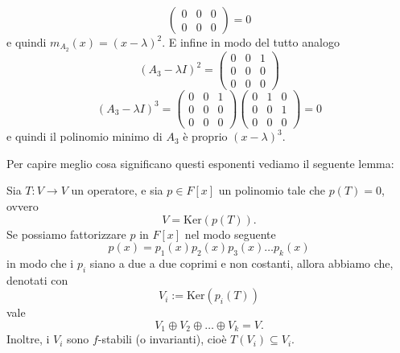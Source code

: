\documentclass[11pt]{scrartcl}
\renewcommand{\ker}[1]{\text{Ker}\left(#1\right)}
\begin{document}
\begin{example}
$$\begin{pmatrix}
   	 	0 & 0 & 0 \\
   	 	0 & 0 & 0
   	 	\end{pmatrix} = 0$$
   	 	e quindi $m_{A_2}(x)=(x-\lambda)^2$. E infine in modo del tutto analogo
   	 	$$(A_3-\lambda I)^2=
   	 	\begin{pmatrix}
   	 		0 & 0 & 1 \\
   	 		0 & 0 & 0 \\
   	 		0 & 0 & 0
   	 	\end{pmatrix}
   	 	$$
   	 	$$
   	 	(A_3-\lambda I)^3=
   	 	\begin{pmatrix}
   	 		0 & 0 & 1 \\
   	 		0 & 0 & 0 \\
   	 		0 & 0 & 0
   	 	\end{pmatrix}
   	 	\begin{pmatrix}
   	 		0 & 1 & 0 \\
   	 		0 & 0 & 1 \\
   	 		0 & 0 & 0
   	 	\end{pmatrix}=0
   	 	$$
   	 	e quindi il polinomio minimo di $A_3$ è proprio $(x-\lambda)^3$.
   	 \end{example}
   	 Per capire meglio cosa significano questi esponenti vediamo il seguente lemma:
   	 \begin{lemma}[di decomposizione]
   	 	Sia $T:V\to V$ un operatore, e sia $p\in F[x]$ un polinomio tale che $p(T)=0$, ovvero
   	 	$$V=\ker{p(T)}.$$
   	 	Se possiamo fattorizzare $p$ in $F[x]$ nel modo seguente
   	 	$$p(x)=p_1(x)p_2(x)p_3(x)\dots p_k(x)$$
   	 	in modo che i $p_i$ siano a due a due coprimi e non costanti,
   	 	allora abbiamo che, denotati con
   	 	$$V_i:=\ker{p_i(T)}$$
   	 	vale
   	 	$$V_1\oplus V_2\oplus \dots \oplus V_k=V.$$
   	 	Inoltre, i $V_i$ sono $f$-stabili (o invarianti), cioè $T(V_i)\subseteq V_i$.
   	 \end{lemma}
\end{document}
